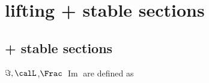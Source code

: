 \section{lifting + stable sections}


\subsection{+ stable sections}

    \begin{definition}
        \(\Im, \calL\),\(\Frac\) \(\operatorname{Im}\) are defined as 
    \end{definition}